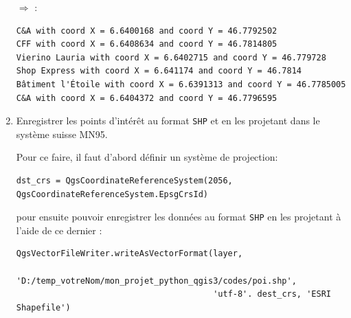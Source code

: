 \documentclass[11pt]{article}
\begin{document}
\begin{enumerate}
$\Rightarrow$ \underline{}:
\vspace*{-1em}
\begin{center}
\begin{minipage}[t]{0.80\textwidth}
\begin{verbatim}
C&A with coord X = 6.6400168 and coord Y = 46.7792502
CFF with coord X = 6.6408634 and coord Y = 46.7814805
Vierino Lauria with coord X = 6.6402715 and coord Y = 46.779728
Shop Express with coord X = 6.641174 and coord Y = 46.7814
Bâtiment l'Étoile with coord X = 6.6391313 and coord Y = 46.7785005
C&A with coord X = 6.6404372 and coord Y = 46.7796595
\end{verbatim}
\end{minipage}
\end{center}
\vspace*{1em}






\item Enregistrer les points d'intérêt au format \texttt{SHP} et en les projetant dans le système suisse MN95.

Pour ce faire, il faut d'abord définir un système de projection:
\vspace*{-2em}
\begin{center}
\begin{minipage}[t]{0.98\textwidth}
\begin{verbatim}
dst_crs = QgsCoordinateReferenceSystem(2056, QgsCoordinateReferenceSystem.EpsgCrsId)
\end{verbatim}
\end{minipage}
\end{center}
\vspace*{1em}


pour ensuite pouvoir enregistrer les données au format \texttt{SHP} en les projetant à l'aide de ce dernier : 
\vspace*{-2em}
\begin{center}
\begin{minipage}[t]{1\textwidth}
\begin{verbatim}
QgsVectorFileWriter.writeAsVectorFormat(layer, 
                                        'D:/temp_votreNom/mon_projet_python_qgis3/codes/poi.shp', 
                                        'utf-8'. dest_crs, 'ESRI Shapefile')
\end{verbatim}
\end{minipage}
\end{center}
\vspace*{1em}



\end{enumerate}
\end{document}
